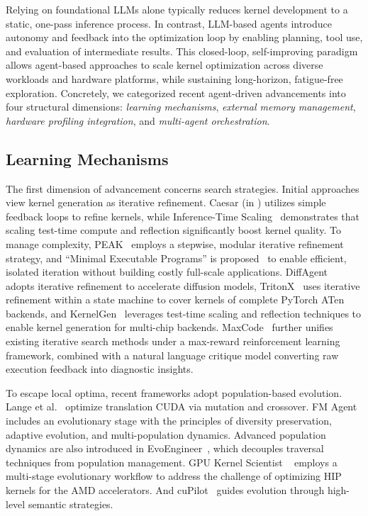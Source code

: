 

Relying on foundational LLMs alone typically reduces kernel development to a static, one-pass inference process. In contrast, LLM-based agents introduce autonomy and feedback into the optimization loop by enabling planning, tool use, and evaluation of intermediate results. This closed-loop, self-improving paradigm allows agent-based approaches to scale kernel optimization across diverse workloads and hardware platforms, while sustaining long-horizon, fatigue-free exploration. Concretely, we categorized recent agent-driven advancements into four structural dimensions: \emph{learning mechanisms}, \emph{external memory management}, \emph{hardware profiling integration}, and \emph{multi-agent orchestration}.

\subsection{Learning Mechanisms}

The first dimension of advancement concerns search strategies. Initial approaches view kernel generation as iterative refinement. Caesar (in \cite{ouyang2025kernelbench}) utilizes simple feedback loops to refine kernels, while Inference-Time Scaling~\cite{chen2025deepseekr1} demonstrates that scaling test-time compute and reflection significantly boost kernel quality. To manage complexity, PEAK~\cite{tariq2025peak} employs a stepwise, modular iterative refinement strategy, and ``Minimal Executable Programs'' is proposed~\cite{chu2025gpu} to enable efficient, isolated iteration without building costly full-scale applications. DiffAgent~\cite{zhu2026diffbench} adopts iterative refinement to accelerate diffusion models, TritonX~\cite{hammond2025agentic} uses iterative refinement within a state machine to cover kernels of complete PyTorch ATen backends, and KernelGen~\cite{kernelgen} leverages test-time scaling and reflection techniques to enable kernel generation for multi-chip backends. MaxCode~\cite{ou2026maxcode} further unifies existing iterative search methods under a max-reward reinforcement learning framework, combined with a natural language critique model converting raw execution feedback into diagnostic insights.


To escape local optima, recent frameworks adopt population-based evolution. Lange et al.~\cite{lange2025towards} optimize translation CUDA via mutation and crossover. FM Agent \cite{li2025fm} includes an evolutionary stage with the principles of diversity preservation, adaptive evolution, and multi-population dynamics. Advanced population dynamics are also introduced in EvoEngineer~\cite{Guo2025EvoEngineer}, which decouples traversal techniques from population management. GPU Kernel Scientist ~\cite{Andrews2025GPUKernelScientist} employs a multi-stage evolutionary workflow to address the challenge of optimizing HIP kernels for the AMD accelerators. And cuPilot~\cite{chen2025cupilot} guides evolution through high-level semantic strategies.


